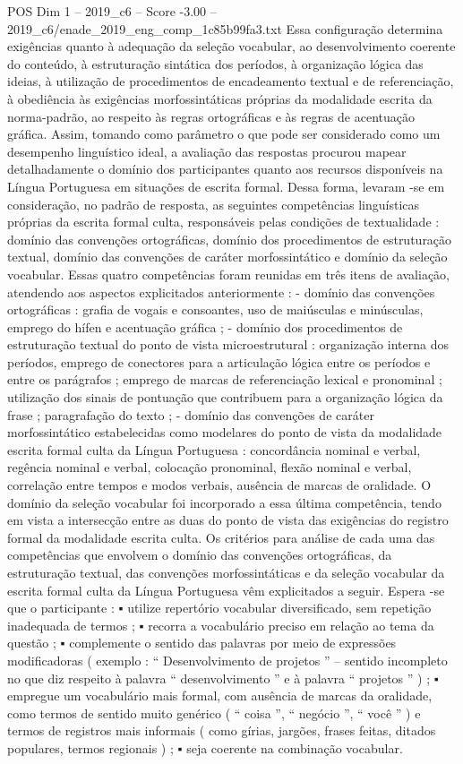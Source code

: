 \begin{textsample}{POS Dim 1 – 2019\_c6 – Score -3.00 – 2019\_c6/enade\_2019\_eng\_comp\_1c85b99fa3.txt}
Essa configuração determina exigências quanto à adequação da seleção vocabular, ao desenvolvimento coerente do conteúdo, à estruturação sintática dos períodos, à organização lógica das ideias, à utilização de procedimentos de encadeamento textual e de referenciação, à obediência às exigências morfossintáticas próprias da modalidade escrita da norma-padrão, ao respeito às regras ortográficas e às regras de acentuação gráfica.
Assim, tomando como parâmetro o que pode ser considerado como um desempenho linguístico ideal, a avaliação das respostas procurou mapear detalhadamente o domínio dos participantes quanto aos recursos disponíveis na Língua Portuguesa em situações de escrita formal.
Dessa forma, levaram -se em consideração, no padrão de resposta, as seguintes competências linguísticas próprias da escrita formal culta, responsáveis pelas condições de textualidade : domínio das convenções ortográficas, domínio dos procedimentos de estruturação textual, domínio das convenções de caráter morfossintático e domínio da seleção vocabular.
Essas quatro competências foram reunidas em três itens de avaliação, atendendo aos aspectos explicitados anteriormente : - domínio das convenções ortográficas : grafia de vogais e consoantes, uso de maiúsculas e minúsculas, emprego do hífen e acentuação gráfica ; - domínio dos procedimentos de estruturação textual do ponto de vista microestrutural : organização interna dos períodos, emprego de conectores para a articulação lógica entre os períodos e entre os parágrafos ; emprego de marcas de referenciação lexical e pronominal ; utilização dos sinais de pontuação que contribuem para a organização lógica da frase ; paragrafação do texto ; - domínio das convenções de caráter morfossintático estabelecidas como modelares do ponto de vista da modalidade escrita formal culta da Língua Portuguesa : concordância nominal e verbal, regência nominal e verbal, colocação pronominal, flexão nominal e verbal, correlação entre tempos e modos verbais, ausência de marcas de oralidade.
O domínio da seleção vocabular foi incorporado a essa última competência, tendo em vista a intersecção entre as duas do ponto de vista das exigências do registro formal da modalidade escrita culta.
Os critérios para análise de cada uma das competências que envolvem o domínio das convenções ortográficas, da estruturação textual, das convenções morfossintáticas e da seleção vocabular da escrita formal culta da Língua Portuguesa vêm explicitados a seguir.
Espera -se que o participante : {\EmojiFont ▪} utilize repertório vocabular diversificado, sem repetição inadequada de termos ; {\EmojiFont ▪} recorra a vocabulário preciso em relação ao tema da questão ; {\EmojiFont ▪} complemente o sentido das palavras por meio de expressões modificadoras ( exemplo : “ Desenvolvimento de projetos ” – sentido incompleto no que diz respeito à palavra “ desenvolvimento ” e à palavra “ projetos ” ) ; {\EmojiFont ▪} empregue um vocabulário mais formal, com ausência de marcas da oralidade, como termos de sentido muito genérico ( “ coisa ”, “ negócio ”, “ você ” ) e termos de registros mais informais ( como gírias, jargões, frases feitas, ditados populares, termos regionais ) ; {\EmojiFont ▪} seja coerente na combinação vocabular.

\end{textsample}

